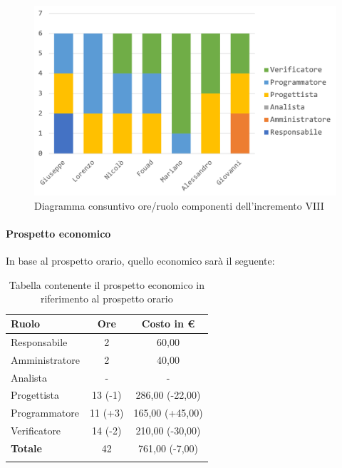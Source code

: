 		\begin{figure}[H]
			\centering
			\includegraphics[width=0.8\linewidth]{images/consuntivo/ConsIncr8-1.png}
			\caption{Diagramma consuntivo ore/ruolo componenti dell'incremento VIII}
			\label{fig:consuntivo diagramma suddivisione ruoli incremento VIII}
		\end{figure}
		
		\paragraph{Prospetto economico}
			In base al prospetto orario, quello economico sarà il seguente: 
		
		\begin{longtable}{|l|c|c|}
			\hline
			\rowcolor{lighter-grayer}
			\textbf{Ruolo} & \textbf{Ore} & \textbf{Costo in € } \\
			\hline
			\endfirsthead
			
			\hline
			Responsabile 	    & 2 & 60,00\\
			\hline 
			\hline
			Amministratore	   & 2 & 40,00\\
			\hline
			\hline
			Analista 				& - & -\\
			\hline
			\hline
			Progettista 		   & 13 (-1) & 286,00 (-22,00)\\
			\hline
			\hline
			Programmatore 	  & 11 (+3) & 165,00 (+45,00)\\
			\hline
			\hline
			Verificatore 		   & 14 (-2) & 210,00 (-30,00)\\
			\hline
			\textbf{Totale} 	 & 42 & 761,00 (-7,00)\\
			\hline
			\caption{Tabella contenente il prospetto economico in riferimento al prospetto orario}
		\end{longtable}
		\pagebreak

